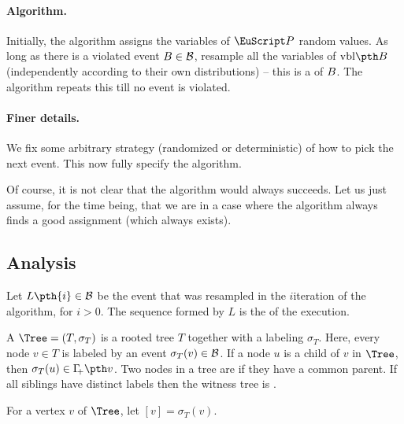 \paragraph*{Algorithm.}
Initially, the algorithm assigns the variables of $\Vars$ random
values. As long as there is a violated event ${B} \in \mathcal{B}$,
resample all the variables of $\vblX{\BEvent}$ (independently
according to their own distributions) -- this is a 
of ${B}$. The algorithm repeats this till no event is violated.

\paragraph*{Finer details.}
We fix some arbitrary strategy (randomized or deterministic) of how to
pick the next event. This now fully specify the algorithm.

\begin{remark_unnumbered}
    Of course, it is not clear that the algorithm would always
    succeeds. Let us just assume, for the time being, that we are in a
    case where the algorithm always finds a good assignment (which
    always exists).
\end{remark_unnumbered}



\newcommand{\ELogChar}{L}%
\newcommand{\ELogX}[1]{\ELogChar\pth{#1}}%

\subsection{Analysis}

Let $\ELogX{i} \in \BEventSet$ be the event that was resampled in the
$i$\th iteration of the algorithm, for $i > 0$. The sequence formed by
$\ELogChar$ is the  of the execution.


A  $\Tree = (T, \sigma_T)$ is a rooted tree $T$
together with a labeling $\sigma_T$. Here, every node $v \in T$ is
labeled by an event $\sigma_T(v) \in\mathcal{B}$. If a node $u$ is a
child of $v$ in $\Tree$, then $\sigma_T(u) \in \NbrCX{v}$.  Two nodes
in a tree are  if they have a common parent. If all
siblings have distinct labels then the witness tree is .

For a vertex $v$ of $\Tree$, let $[v] = \sigma^{}_T(v)$.


